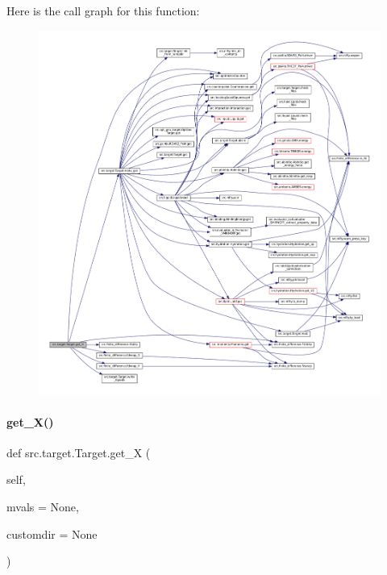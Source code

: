 Here is the call graph for this function\+:
\nopagebreak
\begin{figure}[H]
\begin{center}
\leavevmode
\includegraphics[width=350pt]{classsrc_1_1target_1_1Target_adae73b394ec5a1c22fe57d90265de537_cgraph}
\end{center}
\end{figure}
\mbox{\label{classsrc_1_1target_1_1Target_acd106ed266687c08937944d4c0d17d87}} 
\paragraph{\texorpdfstring{get\+\_\+\+X()}{get\_X()}}
{\footnotesize\ttfamily def src.\+target.\+Target.\+get\+\_\+X (\begin{DoxyParamCaption}\item[{}]{self,  }\item[{}]{mvals = {\ttfamily None},  }\item[{}]{customdir = {\ttfamily None} }\end{DoxyParamCaption})\hspace{0.3cm}{\ttfamily [inherited]}}



